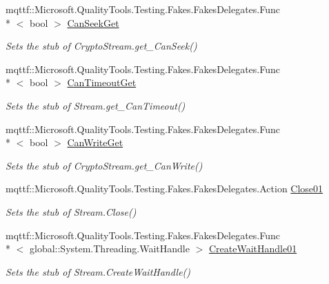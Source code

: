 \begin{DoxyCompactItemize}
mqttf\-::\-Microsoft.\-Quality\-Tools.\-Testing.\-Fakes.\-Fakes\-Delegates.\-Func\\*
$<$ bool $>$ \hyperlink{class_system_1_1_security_1_1_cryptography_1_1_fakes_1_1_stub_crypto_stream_a05d3e8d2774bfa618801463593cf801b}{Can\-Seek\-Get}
\begin{DoxyCompactList}\small\item\em Sets the stub of Crypto\-Stream.\-get\-\_\-\-Can\-Seek()\end{DoxyCompactList}\item 
mqttf\-::\-Microsoft.\-Quality\-Tools.\-Testing.\-Fakes.\-Fakes\-Delegates.\-Func\\*
$<$ bool $>$ \hyperlink{class_system_1_1_security_1_1_cryptography_1_1_fakes_1_1_stub_crypto_stream_a80da51fd11444c8a7fd87decac147b90}{Can\-Timeout\-Get}
\begin{DoxyCompactList}\small\item\em Sets the stub of Stream.\-get\-\_\-\-Can\-Timeout()\end{DoxyCompactList}\item 
mqttf\-::\-Microsoft.\-Quality\-Tools.\-Testing.\-Fakes.\-Fakes\-Delegates.\-Func\\*
$<$ bool $>$ \hyperlink{class_system_1_1_security_1_1_cryptography_1_1_fakes_1_1_stub_crypto_stream_a892b09c2e40ba59d840adedcfab68ce3}{Can\-Write\-Get}
\begin{DoxyCompactList}\small\item\em Sets the stub of Crypto\-Stream.\-get\-\_\-\-Can\-Write()\end{DoxyCompactList}\item 
mqttf\-::\-Microsoft.\-Quality\-Tools.\-Testing.\-Fakes.\-Fakes\-Delegates.\-Action \hyperlink{class_system_1_1_security_1_1_cryptography_1_1_fakes_1_1_stub_crypto_stream_a961f813df7f55aefa2b4f6eddb85bcbb}{Close01}
\begin{DoxyCompactList}\small\item\em Sets the stub of Stream.\-Close()\end{DoxyCompactList}\item 
mqttf\-::\-Microsoft.\-Quality\-Tools.\-Testing.\-Fakes.\-Fakes\-Delegates.\-Func\\*
$<$ global\-::\-System.\-Threading.\-Wait\-Handle $>$ \hyperlink{class_system_1_1_security_1_1_cryptography_1_1_fakes_1_1_stub_crypto_stream_aeaf39a09916f20448269c022d5ab99ec}{Create\-Wait\-Handle01}
\begin{DoxyCompactList}\small\item\em Sets the stub of Stream.\-Create\-Wait\-Handle()\end{DoxyCompactList}\item 

\end{DoxyCompactItemize}
